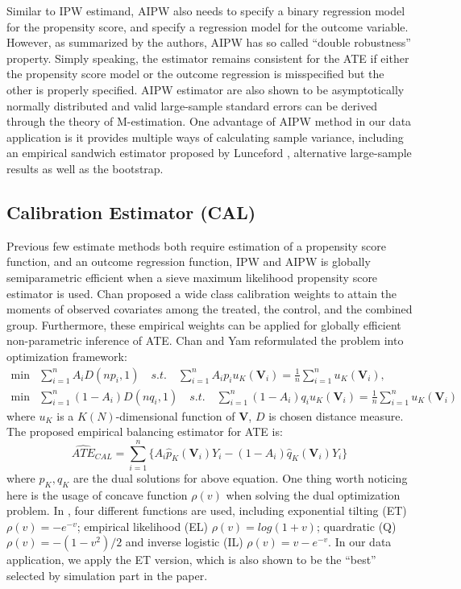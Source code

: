 \documentclass[12pt, oneside]{article}
\newcommand{\bV}{\mathbf{V}}
\begin{document}
Similar to IPW estimand, AIPW also needs to specify a binary regression model for the propensity score, and specify a regression model for the outcome variable. However, as summarized by the authors, AIPW has so called ``double robustness'' property. Simply speaking, the estimator remains consistent for the ATE if either the propensity score model or the outcome regression is misspecified but the other is properly specified. AIPW estimator are also shown to be asymptotically normally distributed and valid large-sample standard errors can be derived through the theory of M-estimation. One advantage of AIPW method in our data application is it provides multiple ways of calculating sample variance, including an empirical sandwich estimator proposed by Lunceford \cite{Luncefird2004}, alternative large-sample results as well as the bootstrap. 

\subsection{Calibration Estimator (CAL)}
Previous few estimate methods both require estimation of a propensity score function, and an outcome regression function, IPW and AIPW is globally semiparametric efficient when a sieve maximum likelihood propensity score estimator is used. Chan \cite{Chan2016} proposed a wide class calibration weights to attain the moments of observed covariates among the treated, the control, and the combined group. Furthermore, these empirical weights can be applied for globally efficient non-parametric inference of ATE. Chan and Yam reformulated the problem into optimization framework:
\begin{equation}
\begin{split}
\mbox{min} & \sum_{i=1}^nA_iD(np_i,1)\quad s.t.\quad \sum_{i=1}^nA_ip_iu_K(\bV_i)=\frac{1}{n}\sum_{i=1}^nu_K(\bV_i), \\
\mbox{min} & \sum_{i=1}^n(1-A_i)D(nq_i,1)\quad s.t.\quad \sum_{i=1}^n(1-A_i)q_iu_K(\bV_i)=\frac{1}{n}\sum_{i=1}^nu_K(\bV_i) 
\end{split}
\end{equation}
where $u_K$ is a $K(N)$-dimensional function of $\bV$, $D$ is chosen distance measure. The proposed empirical balancing estimator for ATE is:
\begin{equation}
\widehat{ATE}_{CAL} = \sum_{i=1}^n\{A_i\hat{p}_K(\bV_i)Y_i-(1-A_i)\hat{q}_K(\bV_i)Y_i\}
\end{equation}
where $\hat{p}_K,\hat{q}_K$ are the dual solutions for above equation. One thing worth noticing here is the usage of concave function $\rho(v)$ when solving the dual optimization problem. In \cite{Chan2016}, four different functions are used, including exponential tilting (ET) $\rho(v)=-e^{-v}$; empirical likelihood (EL) $\rho(v)=log(1+v)$; quardratic (Q) $\rho(v)=-(1-v^2)/2$ and inverse logistic (IL) $\rho(v)=v-e^{-v}$. In our data application, we apply the ET version, which is also shown to be the ``best'' selected by simulation part in the paper.
\end{document}
